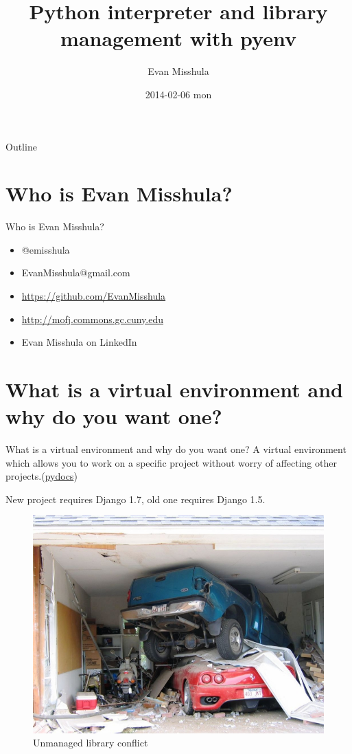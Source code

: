 \documentclass[bigger]{beamer}
\author{Evan Misshula}
\date{2014-02-06 mon}
\title{Python interpreter and library management with pyenv}
\begin{document}
\maketitle
\begin{frame}{Outline}
\tableofcontents
\end{frame}


\section{Who is Evan Misshula?}
\label{sec-1}
\begin{frame}[label=sec-1-1]{Who is Evan Misshula?}
\begin{itemize}
\item @emisshula
\item EvanMisshula@gmail.com
\item \url{https://github.com/EvanMisshula}
\item \url{http://mofj.commons.gc.cuny.edu}
\item Evan Misshula on LinkedIn
\end{itemize}
\end{frame}
\section{What is a virtual environment and why do you want one?}
\label{sec-2}
\begin{frame}[label=sec-2-1]{What is a virtual environment and why do you want one?}
A virtual environment which allows you to work on a specific
project without worry of affecting other projects.(\href{http://docs.python-guide.org/en/latest/dev/virtualenvs/}{pydocs})
\begin{exampleblock}{New project requires Django 1.7, old one requires Django 1.5.}

\end{exampleblock}
\end{frame}
\begin{frame}[label=sec-2-2]{}
\begin{figure}[htb]
\centering
\includegraphics[width=.9\linewidth]{./images/2CarGarage1.jpg}
\caption{Unmanaged library conflict}
\end{figure}
\end{frame}
\end{document}
